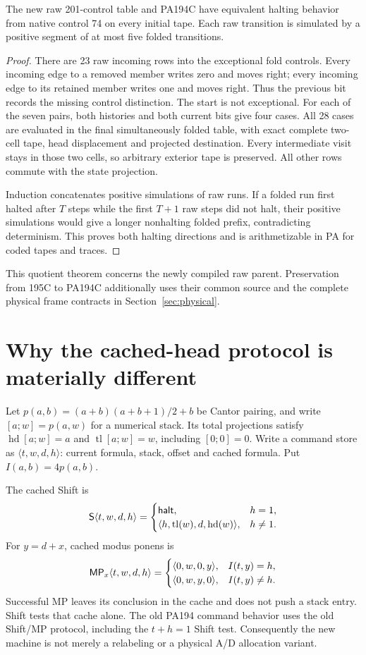 \documentclass[11pt,letterpaper]{article}
\begin{document}
\begin{lemma}
The new raw 201-control table and PA194C have equivalent halting behavior
from native control 74 on every initial tape. Each raw transition is simulated
by a positive segment of at most five folded transitions.
\end{lemma}
\begin{proof}
There are 23 raw incoming rows into the exceptional fold controls. Every
incoming edge to a removed member writes zero and moves right; every incoming
edge to its retained member writes one and moves right. Thus the previous bit
records the missing control distinction. The start is not exceptional.
For each of the seven pairs, both histories and both current bits give four
cases. All 28 cases are evaluated in the final simultaneously folded table,
with exact complete two-cell tape, head displacement and projected destination.
Every intermediate visit stays in those two cells, so arbitrary exterior tape
is preserved. All other rows commute with the state projection.

Induction concatenates positive simulations of raw runs. If a folded run
first halted after $T$ steps while the first $T+1$ raw steps did not halt,
their positive simulations would give a longer nonhalting folded prefix,
contradicting determinism. This proves both halting directions and is
arithmetizable in PA for coded tapes and traces.
\end{proof}

This quotient theorem concerns the newly compiled raw parent. Preservation
from 195C to PA194C additionally uses their common source and the complete
physical frame contracts in Section~\ref{sec:physical}.

\section{Why the cached-head protocol is materially different}
\label{sec:commands}

Let $p(a,b)=(a+b)(a+b+1)/2+b$ be Cantor pairing, and write
$[a;w]=p(a,w)$ for a numerical stack. Its total projections satisfy
$\operatorname{hd}[a;w]=a$ and $\operatorname{tl}[a;w]=w$, including
$[0;0]=0$. Write a command store as $\langle t,w,d,h\rangle$: current
formula, stack, offset and cached formula. Put $I(a,b)=4p(a,b)$.

The cached Shift is
\[
 \mathsf S\langle t,w,d,h\rangle=
 \begin{cases}
  \mathsf{halt},&h=1,\\
  \langle h,\operatorname{tl}(w),d,\operatorname{hd}(w)\rangle,&h\ne1.
 \end{cases}
\]
For $y=d+x$, cached modus ponens is
\[
 \mathsf{MP}_x\langle t,w,d,h\rangle=
 \begin{cases}
  \langle0,w,0,y\rangle,&I(t,y)=h,\\
  \langle0,w,y,0\rangle,&I(t,y)\ne h.
 \end{cases}
\]
Successful MP leaves its conclusion in the cache and does not push a stack
entry. Shift tests that cache alone. The old PA194 command behavior uses the
old Shift/MP protocol, including the $t+h=1$ Shift test. Consequently the new
machine is not merely a relabeling or a physical A/D allocation variant.
\end{document}

